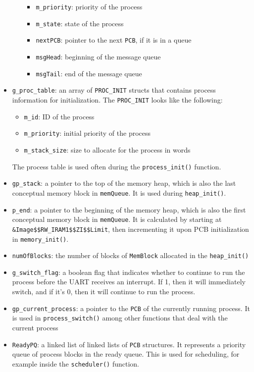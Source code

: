 \documentclass[12pt]{report}
\begin{document}
\begin{itemize}
\begin{itemize}
\begin{itemize}
          \item \texttt{m_priority}: priority of the process
          \item \texttt{m_state}: state of the process
          \item \texttt{nextPCB}: pointer to the next \texttt{PCB}, if it is in a queue
          \item \texttt{msgHead}: beginning of the message queue
          \item \texttt{msgTail}: end of the message queue
        \end{itemize}
    \end{itemize}
  \item \texttt{g_proc_table}: an array of \texttt{PROC_INIT} structs that contains process information for initialization. The \texttt{PROC_INIT} looks like the following:
    \begin{itemize}
      \item \texttt{m_id}: ID of the process
      \item \texttt{m_priority}: initial priority of the process
      \item \texttt{m_stack_size}: size to allocate for the process in words
    \end{itemize}
  The process table is used often during the \texttt{process_init()} function.
  \item \texttt{gp_stack}: a pointer to the top of the memory heap, which is also the last conceptual memory block in \texttt{memQueue}. It is used during \texttt{heap_init()}.
  \item \texttt{p_end}: a pointer to the beginning of the memory heap, which is also the first conceptual memory block in \texttt{memQueue}. It is calculated by starting at \texttt{\&Image\$\$RW_IRAM1\$\$ZI\$\$Limit}, then incrementing it upon PCB initialization in \texttt{memory_init()}.
  \item \texttt{numOfBlocks}: the number of blocks of \texttt{MemBlock} allocated in the \texttt{heap_init()}
  \item \texttt{g_switch_flag}: a boolean flag that indicates whether to continue to run the process before the UART receives an interrupt. If 1, then it will immediately switch, and if it's 0, then it will continue to run the process.
  \item \texttt{gp_current_process}: a pointer to the \texttt{PCB} of the currently running process. It is used in \texttt{process_switch()} among other functions that deal with the current process
  \item \texttt{ReadyPQ}: a linked list of linked lists of \texttt{PCB} structures. It represents a priority queue of process blocks in the ready queue. This is used for scheduling, for example inside the \texttt{scheduler()} function.

\end{itemize}
\end{document}
